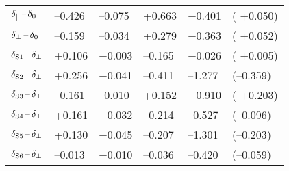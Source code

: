 \begin{table}[htbp]
\begin{tabular}{llllll}
    \hline
    $\delparzero$   &  --0.426  &  --0.075    &   +0.663  &   +0.401  &  ( +0.050)                      \\
    $\delperpzero$  &  --0.159  &  --0.034    &   +0.279  &   +0.363  &  ( +0.052)                      \\
    $\delSperp[1]$  &   +0.106  &   +0.003    &  --0.165  &   +0.026  &  ( +0.005)                      \\
    $\delSperp[2]$  &   +0.256  &   +0.041    &  --0.411  &  --1.277  &  (--0.359)                      \\
    $\delSperp[3]$  &  --0.161  &  --0.010    &   +0.152  &   +0.910  &  ( +0.203)                      \\
    $\delSperp[4]$  &   +0.161  &   +0.032    &  --0.214  &  --0.527  &  (--0.096)                      \\
    $\delSperp[5]$  &   +0.130  &   +0.045    &  --0.207  &  --1.301  &  (--0.203)                      \\
    $\delSperp[6]$  &  --0.013  &   +0.010    &  --0.036  &  --0.420  &  (--0.059)                      \\
    \hline
  \end{tabular}
\end{table}

